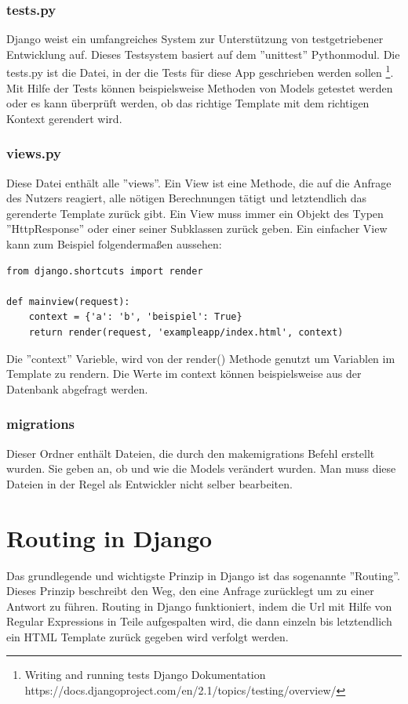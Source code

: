 \documentclass{article}
\begin{document}
\subsubsection{tests.py}
Django weist ein umfangreiches System zur Unterstützung von testgetriebener Entwicklung auf. Dieses Testsystem basiert auf dem ''unittest'' Pythonmodul. Die tests.py ist die Datei, in der die Tests für diese App geschrieben werden sollen
\footnote{Writing and running tests Django Dokumentation \newline https://docs.djangoproject.com/en/2.1/topics/testing/overview/}.
Mit Hilfe der Tests können beispielsweise Methoden von Models getestet werden oder es kann überprüft werden, ob das richtige Template mit dem richtigen Kontext gerendert wird.
\subsubsection{views.py}
Diese Datei enthält alle ''views''. Ein View ist eine Methode, die auf die Anfrage des Nutzers reagiert, alle nötigen Berechnungen tätigt und letztendlich das gerenderte Template zurück gibt. Ein View muss immer ein Objekt des Typen ''HttpResponse'' oder einer seiner Subklassen zurück geben. Ein einfacher View kann zum Beispiel folgendermaßen aussehen:
\begin{verbatim}
from django.shortcuts import render

def mainview(request):
	context = {'a': 'b', 'beispiel': True}
    return render(request, 'exampleapp/index.html', context)
\end{verbatim} 
Die ''context'' Varieble, wird von der render() Methode genutzt um Variablen im Template zu rendern. Die Werte im context können beispielsweise aus der Datenbank abgefragt werden.
\subsubsection{migrations}
Dieser Ordner enthält Dateien, die durch den makemigrations Befehl erstellt wurden. Sie geben an, ob und wie die Models verändert wurden. Man muss diese Dateien in der Regel als Entwickler nicht selber bearbeiten.



\section{Routing in Django}
Das grundlegende und wichtigste Prinzip in Django ist das sogenannte ''Routing''. Dieses Prinzip beschreibt den Weg, den eine Anfrage zurücklegt um zu einer Antwort zu führen. Routing in Django funktioniert, indem die Url mit Hilfe von Regular Expressions in Teile aufgespalten wird, die dann einzeln bis letztendlich ein HTML Template zurück gegeben wird verfolgt werden.
\end{document}
